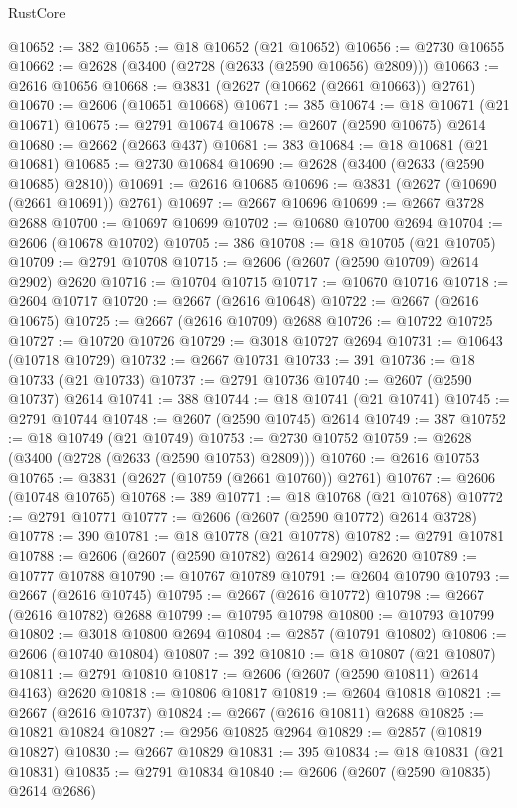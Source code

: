 \begin{lexlean}{RustCore}
\begin{coremodule}
@10652 := 382
@10655 := @18 @10652 (@21 @10652)
@10656 := @2730 @10655
@10662 := @2628 (@3400 (@2728 (@2633 (@2590 @10656) @2809)))
@10663 := @2616 @10656
@10668 := @3831 (@2627 (@10662 (@2661 @10663)) @2761)
@10670 := @2606 (@10651 @10668)
@10671 := 385
@10674 := @18 @10671 (@21 @10671)
@10675 := @2791 @10674
@10678 := @2607 (@2590 @10675) @2614
@10680 := @2662 (@2663 @437)
@10681 := 383
@10684 := @18 @10681 (@21 @10681)
@10685 := @2730 @10684
@10690 := @2628 (@3400 (@2633 (@2590 @10685) @2810))
@10691 := @2616 @10685
@10696 := @3831 (@2627 (@10690 (@2661 @10691)) @2761)
@10697 := @2667 @10696
@10699 := @2667 @3728 @2688
@10700 := @10697 @10699
@10702 := @10680 @10700 @2694
@10704 := @2606 (@10678 @10702)
@10705 := 386
@10708 := @18 @10705 (@21 @10705)
@10709 := @2791 @10708
@10715 := @2606 (@2607 (@2590 @10709) @2614 @2902) @2620
@10716 := @10704 @10715
@10717 := @10670 @10716
@10718 := @2604 @10717
@10720 := @2667 (@2616 @10648)
@10722 := @2667 (@2616 @10675)
@10725 := @2667 (@2616 @10709) @2688
@10726 := @10722 @10725
@10727 := @10720 @10726
@10729 := @3018 @10727 @2694
@10731 := @10643 (@10718 @10729)
@10732 := @2667 @10731
@10733 := 391
@10736 := @18 @10733 (@21 @10733)
@10737 := @2791 @10736
@10740 := @2607 (@2590 @10737) @2614
@10741 := 388
@10744 := @18 @10741 (@21 @10741)
@10745 := @2791 @10744
@10748 := @2607 (@2590 @10745) @2614
@10749 := 387
@10752 := @18 @10749 (@21 @10749)
@10753 := @2730 @10752
@10759 := @2628 (@3400 (@2728 (@2633 (@2590 @10753) @2809)))
@10760 := @2616 @10753
@10765 := @3831 (@2627 (@10759 (@2661 @10760)) @2761)
@10767 := @2606 (@10748 @10765)
@10768 := 389
@10771 := @18 @10768 (@21 @10768)
@10772 := @2791 @10771
@10777 := @2606 (@2607 (@2590 @10772) @2614 @3728)
@10778 := 390
@10781 := @18 @10778 (@21 @10778)
@10782 := @2791 @10781
@10788 := @2606 (@2607 (@2590 @10782) @2614 @2902) @2620
@10789 := @10777 @10788
@10790 := @10767 @10789
@10791 := @2604 @10790
@10793 := @2667 (@2616 @10745)
@10795 := @2667 (@2616 @10772)
@10798 := @2667 (@2616 @10782) @2688
@10799 := @10795 @10798
@10800 := @10793 @10799
@10802 := @3018 @10800 @2694
@10804 := @2857 (@10791 @10802)
@10806 := @2606 (@10740 @10804)
@10807 := 392
@10810 := @18 @10807 (@21 @10807)
@10811 := @2791 @10810
@10817 := @2606 (@2607 (@2590 @10811) @2614 @4163) @2620
@10818 := @10806 @10817
@10819 := @2604 @10818
@10821 := @2667 (@2616 @10737)
@10824 := @2667 (@2616 @10811) @2688
@10825 := @10821 @10824
@10827 := @2956 @10825 @2964
@10829 := @2857 (@10819 @10827)
@10830 := @2667 @10829
@10831 := 395
@10834 := @18 @10831 (@21 @10831)
@10835 := @2791 @10834
@10840 := @2606 (@2607 (@2590 @10835) @2614 @2686)

\end{coremodule}
\end{lexlean}

